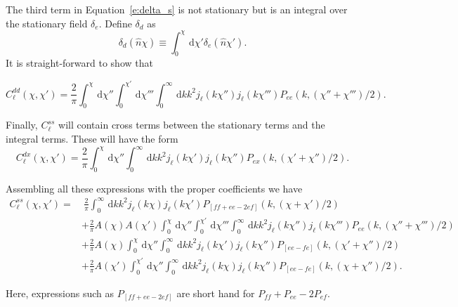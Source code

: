 \documentclass[twocolumn,prl,nofootinbib,floatfix]{revtex4-1}
\newcommand{\ud}{\,\mathrm{d}}
\begin{document}
The third term in Equation~\ref{e:delta_s} is not stationary but is an integral
over the stationary field $\delta_e$.
Define $\delta_d$ as
\begin{equation}
    \delta_d(\hat n \chi) \equiv \int_0^\chi \ud \chi' \delta_e(\hat n \chi').
\end{equation}
It is straight-forward to show that
\begin{widetext}
\begin{equation}
C^{dd}_\ell(\chi,\chi')
    =
    \frac{2}{\pi}
    \int_0^\chi\ud\chi''
    \int_0^{\chi'}\ud\chi'''
    \int_0^\infty\ud k k^2 j_\ell(k\chi'') j_{\ell}(k\chi''')
    P_{ee}(k, (\chi''+\chi''')/2).
\end{equation}

Finally, $C^{ss}_\ell$ will contain cross terms between the stationary terms
and the integral terms.  These will have the form
\begin{equation}
C^{dx}_\ell(\chi,\chi')
    =
    \frac{2}{\pi}
    \int_0^\chi\ud\chi''
    \int_0^\infty\ud k k^2 
    j_\ell(k\chi') j_{\ell}(k\chi'')P_{ex}(k, (\chi' + \chi'')/2).
\end{equation}

Assembling all these expressions with the proper coefficients we have
\begin{align}
    \label{e:Clss}
C^{ss}_\ell(\chi,\chi') = &~
    \frac{2}{\pi}
    \int_0^\infty\ud k k^2
    j_\ell(k\chi) j_{\ell}(k\chi')
    P_{[ff + ee - 2ef]}(k, (\chi + \chi')/2)
    \nonumber\\
    & +
    \frac{2}{\pi}
    A(\chi) A(\chi')
    \int_0^\chi\ud\chi''
    \int_0^{\chi'}\ud\chi'''
    \int_0^\infty\ud k k^2 j_\ell(k\chi'') j_{\ell}(k\chi''')
    P_{ee}(k, (\chi''+\chi''')/2)
    \nonumber\\
    & +
    \frac{2}{\pi}
    A(\chi)
    \int_0^\chi\ud\chi''
    \int_0^\infty\ud k k^2 
    j_\ell(k\chi') j_{\ell}(k\chi'')
    P_{[ee - fe]}(k, (\chi' + \chi'')/2)
    \nonumber\\
    & +
    \frac{2}{\pi}
    A(\chi')
    \int_0^{\chi'}\ud\chi''
    \int_0^\infty\ud k k^2 
    j_\ell(k\chi) j_{\ell}(k\chi'')
    P_{[ee - fe]}(k, (\chi + \chi'')/2).
\end{align}
\end{widetext}
Here, expressions such as $P_{[ff + ee - 2ef]}$ are short hand for $P_{ff} +
P_{ee} - 2P_{ef}$.
\end{document}
